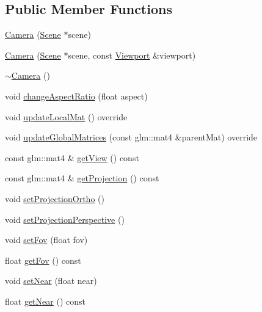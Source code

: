 \subsection*{Public Member Functions}
\begin{DoxyCompactItemize}
\item 
\mbox{\hyperlink{classec_1_1_camera_a5b8034c32e082171bdb61033781cdcc3}{Camera}} (\mbox{\hyperlink{classec_1_1_scene}{Scene}} $\ast$scene)
\item 
\mbox{\hyperlink{classec_1_1_camera_ab5fa55c91ae586754b613c3e8f33b31c}{Camera}} (\mbox{\hyperlink{classec_1_1_scene}{Scene}} $\ast$scene, const \mbox{\hyperlink{classec_1_1_viewport}{Viewport}} \&viewport)
\item 
\mbox{\hyperlink{classec_1_1_camera_a11d706554e37d6dde0b9313a445cbd4b}{$\sim$\+Camera}} ()
\item 
void \mbox{\hyperlink{classec_1_1_camera_ae66d4600de35284b8c6846e3dbd9c12d}{change\+Aspect\+Ratio}} (float aspect)
\item 
void \mbox{\hyperlink{classec_1_1_camera_acff95ac4ca039715d67c83111d03b8c1}{update\+Local\+Mat}} () override
\item 
void \mbox{\hyperlink{classec_1_1_camera_a1661dae4666cf50e697603904c96df6a}{update\+Global\+Matrices}} (const glm\+::mat4 \&parent\+Mat) override
\item 
const glm\+::mat4 \& \mbox{\hyperlink{classec_1_1_camera_aa273a9bbe51bc00e8b0a35d8c79b0766}{get\+View}} () const
\item 
const glm\+::mat4 \& \mbox{\hyperlink{classec_1_1_camera_a5c245ceac5e710447b88a26a66dcc348}{get\+Projection}} () const
\item 
void \mbox{\hyperlink{classec_1_1_camera_ae36280401efe1d0f5bef9997952f8814}{set\+Projection\+Ortho}} ()
\item 
void \mbox{\hyperlink{classec_1_1_camera_af3544fbe030aadcd6bdfef8cb94e7b5c}{set\+Projection\+Perspective}} ()
\item 
void \mbox{\hyperlink{classec_1_1_camera_a1003feebe7df69a508f684c1c67f1388}{set\+Fov}} (float fov)
\item 
float \mbox{\hyperlink{classec_1_1_camera_a741cb88974dfd00492315ccf613e8539}{get\+Fov}} () const
\item 
void \mbox{\hyperlink{classec_1_1_camera_af0c1f82f4cb2aeb3908b858093080556}{set\+Near}} (float near)
\item 
float \mbox{\hyperlink{classec_1_1_camera_a02786d8adecb275e6182cf166b65edb4}{get\+Near}} () const
\item 

\end{DoxyCompactItemize}

